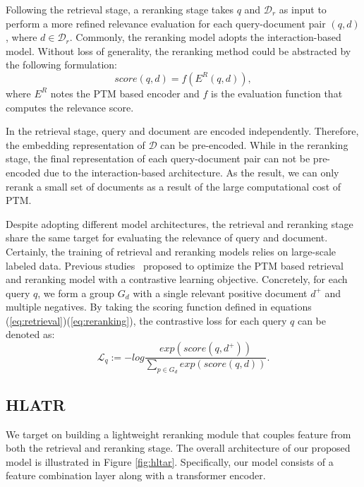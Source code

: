 \documentclass[11pt]{article}
\begin{document}
Following the retrieval stage, a reranking stage takes $q$ and $\mathcal{D}_r$ as input to perform a more refined relevance evaluation for each query-document pair $(q, d)$, where $d \in \mathcal{D}_r$. Commonly, the reranking model adopts the interaction-based model. Without loss of generality, the reranking method could be abstracted by the following formulation:
\begin{equation}
\label{eq:reranking}
    score(q,d) = f(E^R(q,d)),
\end{equation}
where $E^R$ notes the PTM based encoder and $f$ is the evaluation function that computes the relevance score. 

In the retrieval stage, query and document are encoded independently. Therefore, the embedding representation of $\mathcal{D}$ can be pre-encoded. While in the reranking stage, the final representation of each query-document pair can not be pre-encoded due to the interaction-based architecture. As the result, we can only rerank a small set of documents as a result of the large computational cost of PTM. 

Despite adopting different model architectures, the retrieval and reranking stage share the same target for evaluating the relevance of query and document. Certainly, the training of retrieval and reranking models relies on large-scale labeled data. Previous studies~\cite{karpukhin2020dense,gao2021rethink} proposed to optimize the PTM based retrieval and reranking model with a contrastive learning objective. Concretely, for each query $q$, we form a group $G_d$ with a single relevant positive document $d^+$ and multiple negatives. By taking the scoring function defined in equations (\ref{eq:retrieval})(\ref{eq:reranking}), the contrastive loss for each query $q$ can be denoted as:
\begin{equation}
    \mathcal{L}_q := -log\frac{exp(score(q, d^{+}))}{\sum_{p\in G_d} exp(score(q, d))}.
\end{equation}



\subsection{HLATR}
We target on building a lightweight reranking module that couples feature from both the retrieval and reranking stage. The overall architecture of our proposed model is illustrated in Figure \ref{fig:hltar}. Specifically, our model consists of a feature combination layer along with a transformer encoder. 
\end{document}
